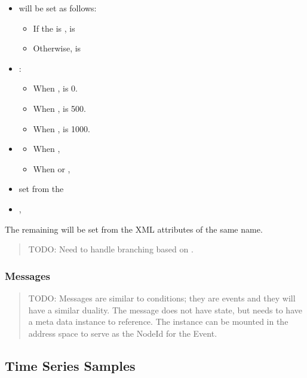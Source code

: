\begin{itemize}
    \item {} will be set as follows:
    \begin{itemize}
        \item If the  is ,  is 
        \item Otherwise,  is 
    \end{itemize}
    \item {}:
    \begin{itemize}
        \item When ,  is 0.
        \item When ,  is 500.
        \item When ,  is 1000.
    \end{itemize}
    \item {}
    \begin{itemize}
        \item When , 
        \item When  or , 
    \end{itemize}
    \item {} set from the 
    \item {}, 
\end{itemize}

The remaining  will be set from the XML attributes of the same name.

\begin{quote}
    \color{red} TODO: Need to handle branching based on .
\end{quote}

\subsubsection{Messages}

\begin{quote}
    \color{red} TODO: Messages are similar to conditions; they are events and they will have a similar duality. The message does not have state, but needs to have a meta data instance to reference. The instance can be mounted in the address space to serve as the NodeId for the Event.
\end{quote}


\subsection{Time Series Samples}
